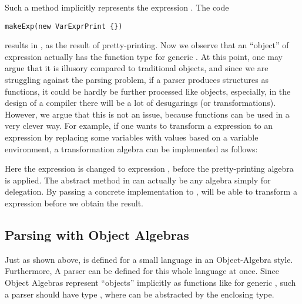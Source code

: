 Such a method implicitly represents the expression . The code

\begin{lstlisting}
makeExp(new VarExprPrint {})
\end{lstlisting}
results in , as the result of pretty-printing. Now we observe that an ``object'' of expression actually
has the function type   for generic . At this point, one may argue
that it is illusory compared to traditional objects, and since we are struggling against the parsing problem, if a parser
produces structures as functions, it could be hardly be further processed like objects, especially, in the design of a compiler
there will be a lot of desugarings (or transformations). However, we argue that this is not an issue, because functions can be used
in a very clever way. For example, if one wants to transform a  expression to an  expression by
replacing some variables with values based on a variable environment, a transformation algebra can be implemented as follows:

Here the  expression  is changed to  expression , before the pretty-printing algebra is applied. The abstract method
 in  can actually be any algebra simply for delegation. By passing a concrete implementation
to ,  will be able to transform a  expression before we obtain the result.

\subsection{Parsing with Object Algebras}\label{subsec:parsingwithoa}

Just as shown above,  is defined for a small language in an Object-Algebra style. Furthermore,
A parser can be defined for this whole language at once. Since Object Algebras represent ``objects'' implicitly as functions like   for generic , such a parser should have type  , where  can be abstracted by the enclosing type.


